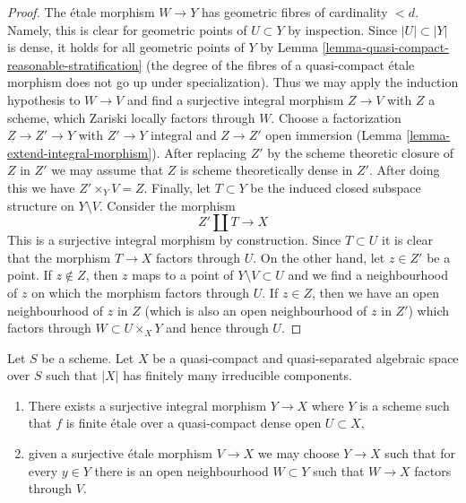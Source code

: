 \begin{proof}
\medskip\noindent
The \'etale morphism $W \to Y$ has geometric fibres of cardinality $< d$.
Namely, this is clear for geometric points of $U \subset Y$ by inspection.
Since $|U| \subset |Y|$ is dense, it holds for all geometric points of $Y$
by Lemma \ref{lemma-quasi-compact-reasonable-stratification}
(the degree of the fibres of a quasi-compact \'etale morphism
does not go up under specialization). Thus we may apply the induction
hypothesis to $W \to V$ and find a surjective integral morphism
$Z \to V$ with $Z$ a scheme, which Zariski locally factors through $W$.
Choose a factorization $Z \to Z' \to Y$ with $Z' \to Y$ integral and
$Z \to Z'$ open immersion
(Lemma \ref{lemma-extend-integral-morphism}).
After replacing $Z'$ by the scheme theoretic closure of $Z$ in $Z'$
we may assume that $Z$ is scheme theoretically dense in $Z'$.
After doing this we have $Z' \times_Y V = Z$. Finally,
let $T \subset Y$ be the induced closed subspace structure on $Y \setminus V$.
Consider the morphism
$$
Z' \amalg T \longrightarrow X
$$
This is a surjective integral morphism by construction.
Since $T \subset U$ it is clear that the morphism $T \to X$
factors through $U$. On the other hand, let $z \in Z'$
be a point. If $z \not \in Z$, then $z$ maps to a point of
$Y \setminus V \subset U$ and we find a neighbourhood of $z$
on which the morphism factors through $U$.
If $z \in Z$, then we have an open neighbourhood of $z$ in $Z$
(which is also an open neighbourhood of $z$ in $Z'$)
which factors through $W \subset U \times_X Y$ and hence through $U$.
\end{proof}

\begin{lemma}
\label{lemma-there-is-a-scheme-integral-over-refined}
Let $S$ be a scheme. Let $X$ be a quasi-compact and quasi-separated
algebraic space over $S$ such that $|X|$ has finitely many irreducible
components.
\begin{enumerate}
\item There exists a surjective integral morphism $Y \to X$ where $Y$
is a scheme such that $f$ is finite \'etale over a quasi-compact
dense open $U \subset X$,
\item given a surjective \'etale morphism $V \to X$ we may choose
$Y \to X$ such that for every $y \in Y$ there is an open neighbourhood
$W \subset Y$ such that $W \to X$ factors through $V$.
\end{enumerate}
\end{lemma}

